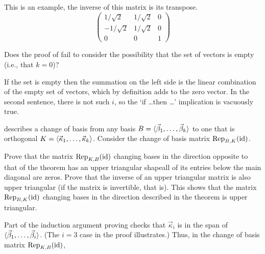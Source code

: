 \begin{exercises}
\begin{answer}
      This is an example, the inverse of this matrix is its transpose.
      \begin{equation*}
        \begin{pmatrix}
          1/\sqrt{2}  &1/\sqrt{2}  &0  \\
         -1/\sqrt{2}  &1/\sqrt{2}  &0  \\
          0           &0           &1
        \end{pmatrix}
      \end{equation*}
    \end{answer}
  \item 
    Does the proof of  fail to consider the
    possibility that the set of vectors is empty (i.e., that $k=0$)?
    \begin{answer}
      If the set is empty then the summation on the left side is the
      linear combination of the empty set of vectors, 
      which by definition adds to the zero vector. 
      In the second sentence, there is not such $i$, so the 
      `if \ldots then \ldots' implication is vacuously true.
    \end{answer}
  \item 
     describes a change of basis 
    from any basis \( B=\langle\vec{\beta}_1,\ldots,\vec{\beta}_k\rangle \)
    to one that is orthogonal 
    \( K=\langle\vec{\kappa}_1,\ldots,\vec{\kappa}_k\rangle \).
    Consider the change of basis matrix ${\rm Rep}_{B,K}(\mbox{id})$. 
    \begin{exparts}
      \partsitem Prove that the matrix ${\rm Rep}_{K,B}(\mbox{id})$
        changing bases in the direction opposite to that of the theorem 
        has an upper triangular shape\Dash all
        of its entries below the main diagonal are zeros.
      \partsitem Prove that the inverse of an upper triangular matrix is 
        also upper triangular (if the matrix is invertible, that is).
        This shows that the matrix ${\rm Rep}_{B,K}(\mbox{id})$  changing bases 
        in the direction described in the theorem is upper triangular.
    \end{exparts}
    \begin{answer} 
      \begin{exparts}
        \partsitem Part of the induction argument proving 
           checks that 
          $\vec{\kappa}_i$ is in the span of 
          $\langle\vec{\beta}_1,\dots,\vec{\beta}_i\rangle$.
          (The $i=3$ case in the proof illustrates.)
          Thus, in the change of basis matrix ${\rm Rep}_{K,B}(\mbox{id})$, 

\end{exparts}
\end{answer}
\end{exercises}
